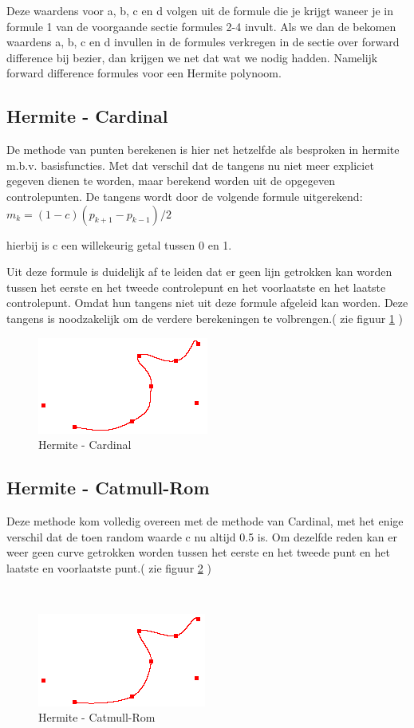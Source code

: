 \documentclass[a4paper,11pt,oneside, titlepage]{article}
\begin{document}
Deze waardens voor a, b, c en d volgen uit de formule die je krijgt waneer je in formule 1 van de voorgaande sectie formules 2-4 invult.
Als we dan de bekomen waardens a, b, c en d invullen in de formules verkregen in de sectie
over forward difference bij bezier, dan krijgen we net dat wat we nodig hadden. Namelijk
forward difference formules voor een Hermite polynoom.
\subsection{Hermite - Cardinal}
De methode van punten berekenen is hier net hetzelfde als besproken in hermite m.b.v. 
basisfuncties.
Met dat verschil dat de tangens nu niet meer expliciet gegeven dienen te worden, maar 
berekend worden uit de opgegeven controlepunten. 
De tangens wordt door de volgende formule uitgerekend:\newline 
$m_k = (1 - c)(p_{k+1} -p_{k-1})/2$

hierbij is c een willekeurig getal tussen 0 en 1.

Uit deze formule is duidelijk af te leiden dat er geen lijn getrokken kan worden 
tussen het eerste en het tweede controlepunt en het voorlaatste en het laatste controlepunt. 
Omdat hun tangens niet uit deze formule afgeleid kan worden. Deze tangens is noodzakelijk
om de verdere berekeningen te volbrengen.( zie figuur \ref{cardinal} )
\begin{figure}[htbp]
\begin{center}
\includegraphics[scale=0.4]{./screenies2/cardinal.png}
\caption{Hermite - Cardinal}\label{cardinal}
\end{center}
\end{figure}
\subsection{Hermite - Catmull-Rom}
Deze methode kom volledig overeen met de methode van Cardinal, met het enige verschil dat
de toen random waarde c nu altijd 0.5 is. Om dezelfde reden kan er weer geen curve getrokken
worden tussen het eerste en het tweede punt en het laatste en voorlaatste punt.( zie figuur
\ref{catmull} )
\begin{figure}[htbp]\
\begin{center}
\includegraphics[scale=0.4]{./screenies2/catmull.png}
\caption{Hermite - Catmull-Rom}\label{catmull}
\end{center}
\end{figure}
\end{document}
